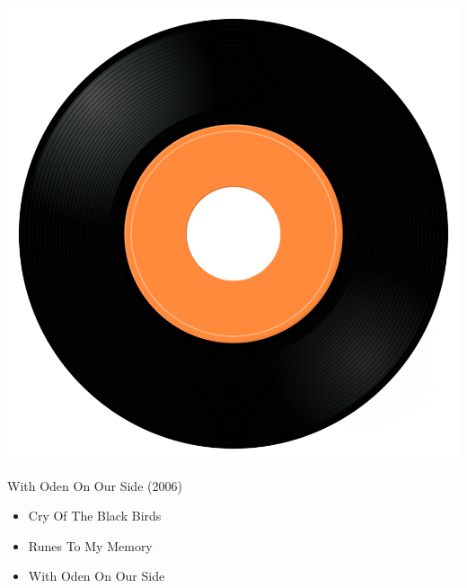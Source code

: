 \begin{minipage}[t]{0.25\textwidth}\vspace{0pt}
\captionsetup{type=figure}
\includegraphics[width=\textwidth]{Images/cover.png}
\caption*{With Oden On Our Side (2006)}
\end{minipage}
\begin{minipage}[t]{0.25\textwidth}\vspace{0pt}
\begin{itemize}[nosep,leftmargin=1em,labelwidth=*,align=left]
	\setlength{\itemsep}{0pt}
	\item Cry Of The Black Birds
	\item Runes To My Memory
	\item With Oden On Our Side
\end{itemize}
\end{minipage}

